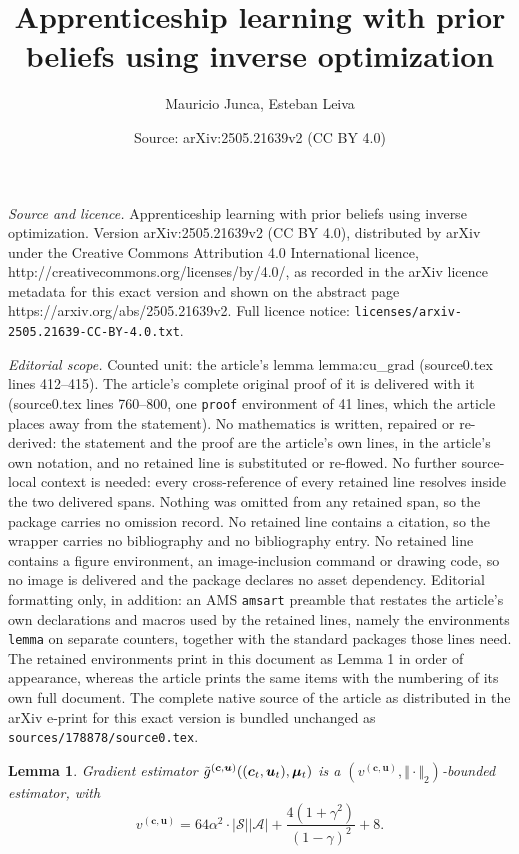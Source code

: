 \documentclass[10pt,a4paper]{amsart}
\title{Apprenticeship learning with prior beliefs using inverse optimization}
\author{Mauricio Junca, Esteban Leiva}
\date{Source: arXiv:2505.21639v2 (CC BY 4.0)}
\newtheorem{lemma}{Lemma}
\def\Ac{\ensuremath{\mathcal{A}}}
\newcommand{\St}{\mathcal{S}}
\def\vc{{\bm{c}}}
\def\vmu{{\bm{\mu}}}
\def\vu{{\bm{u}}}
\begin{document}
\maketitle

\noindent\emph{Source and licence.} Apprenticeship learning with prior beliefs using inverse optimization. Version arXiv:2505.21639v2 (CC BY 4.0), distributed by arXiv under the Creative Commons Attribution 4.0 International licence, http://creativecommons.org/licenses/by/4.0/, as recorded in the arXiv licence metadata for this exact version and shown on the abstract page https://arxiv.org/abs/2505.21639v2. Full licence notice: \texttt{licenses/arxiv-2505.21639-CC-BY-4.0.txt}.\par\smallskip

\noindent\textit{Editorial scope.} Counted unit: the article's lemma lemma:cu\_grad (source0.tex lines 412--415). The article's complete original proof of it is delivered with it (source0.tex lines 760--800, one \texttt{proof} environment of 41 lines, which the article places away from the statement). No mathematics is written, repaired or re-derived: the statement and the proof are the article's own lines, in the article's own notation, and no retained line is substituted or re-flowed.  No further source-local context is needed: every cross-reference of every retained line resolves inside the two delivered spans.  Nothing was omitted from any retained span, so the package carries no omission record.  No retained line contains a citation, so the wrapper carries no bibliography and no bibliography entry.  No retained line contains a figure environment, an image-inclusion command or drawing code, so no image is delivered and the package declares no asset dependency.  Editorial formatting only, in addition: an AMS \texttt{amsart} preamble that restates the article's own declarations and macros used by the retained lines, namely the environments \texttt{lemma} on separate counters, together with the standard packages those lines need.  The retained environments print in this document as Lemma 1 in order of appearance, whereas the article prints the same items with the numbering of its own full document.  The complete native source of the article as distributed in the arXiv e-print for this exact version is bundled unchanged as \texttt{sources/178878/source0.tex}.
\begin{lemma} \label{lemma:cu_grad}
    Gradient estimator $\Tilde{g}^{(\vc,\vu)}((\vc_t,\vu_t),\vmu_t)$ is a $(v^{(\vc,\vu)}, \Vert \cdot \Vert_2)$-bounded estimator, with 
    $$v^{(\vc,\vu)} =  64\alpha^2\cdot |\St||\Ac| + \frac{4(1+\gamma^2)}{(1-\gamma)^2} + 8.$$   
\end{lemma}
\end{document}
